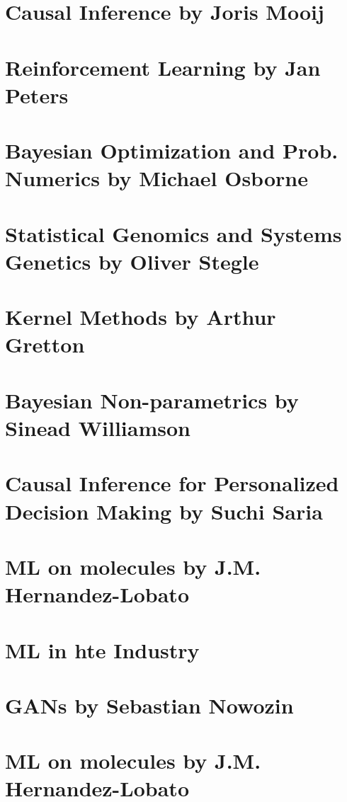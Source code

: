 
\section{Causal Inference by Joris Mooij}
\section{Reinforcement Learning by Jan Peters}
\section{Bayesian Optimization and Prob. Numerics by Michael Osborne}
\section{Statistical Genomics and Systems Genetics by Oliver Stegle}
\section{Kernel Methods by Arthur Gretton}
\section{Bayesian Non-parametrics by Sinead Williamson}
\section{Causal Inference for Personalized Decision Making by Suchi Saria}
\section{ML on molecules by J.M. Hernandez-Lobato}
\section{ML in hte Industry}
\section{GANs by Sebastian Nowozin}
\section{ML on molecules by J.M. Hernandez-Lobato}

